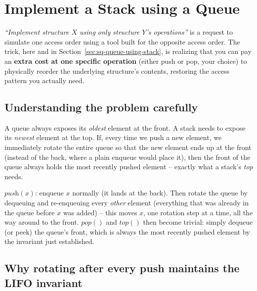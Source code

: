 \section{Implement a Stack using a Queue}
\label{sec:sq-stack-using-queue}


\begin{patternbox}
\emph{``Implement structure $X$ using only structure $Y$'s operations''}
is a request to simulate one access order using a tool built for the
opposite access order. The trick, here and in
Section~\ref{sec:sq-queue-using-stack}, is realizing that you can pay an
\textbf{extra cost at one specific operation} (either push or pop, your
choice) to physically reorder the underlying structure's contents,
restoring the access pattern you actually need.
\end{patternbox}

\subsection*{Understanding the problem carefully}

A queue always exposes its \emph{oldest} element at the front. A stack
needs to expose its \emph{newest} element at the top. If, every time we
push a new element, we immediately rotate the entire queue so that the
new element ends up at the front (instead of the back, where a plain
enqueue would place it), then the front of the queue always holds the most
recently pushed element -- exactly what a stack's \textit{top} needs.

\begin{ideabox}
$\textit{push}(x)$: enqueue $x$ normally (it lands at the back). Then
rotate the queue by dequeuing and re-enqueuing every \emph{other} element
(everything that was already in the queue before $x$ was added) -- this
moves $x$, one rotation step at a time, all the way around to the front.
$\textit{pop}()$ and $\textit{top}()$ then become trivial: simply dequeue
(or peek) the queue's front, which is always the most recently pushed
element by the invariant just established.
\end{ideabox}

\subsection*{Why rotating after every push maintains the LIFO invariant}

